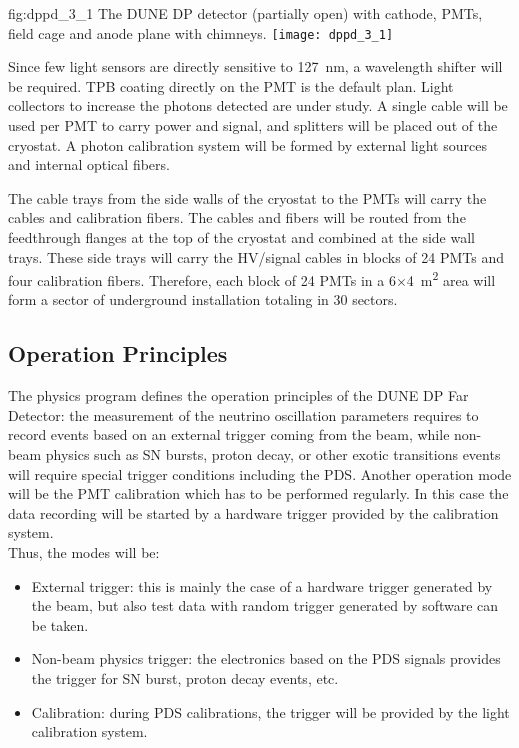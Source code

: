 \begin{dunefigure}{fig:dppd_3_1}
{The DUNE DP detector (partially open) with cathode, PMTs, field cage and anode plane with chimneys.}
\texttt{[image: dppd\_3\_1]}
\end{dunefigure}

Since few light sensors are directly sensitive to \SI{127}{nm}, a wavelength shifter will be required. TPB coating directly on the PMT is the default plan. Light collectors to increase the photons detected are under study. A single cable will be used per PMT to carry power and signal, and splitters will be placed out of the cryostat. A photon calibration system will be formed by external light sources and internal optical fibers.  

The cable trays from the side walls of the cryostat to the PMTs will carry the cables and calibration fibers. The cables and fibers will be routed from the feedthrough flanges at the top of the cryostat and  combined at the side wall trays. These side trays will carry the HV/signal cables in blocks of \num{24} PMTs and four calibration fibers. Therefore, each block of \num{24} PMTs in a \num{6}$\times$\SI{4}{m^2} area will form a sector of underground installation totaling in \num{30} sectors.

\subsection{Operation Principles}
\label{sec:fddp-pd-1.5}

The physics program defines the operation principles of the DUNE DP Far Detector: the measurement of the neutrino oscillation parameters requires to record events based on an external trigger coming from the beam, while non-beam physics such as SN bursts, proton decay, or other exotic transitions events will require special trigger conditions including the PDS. Another operation mode will be the PMT calibration which has to be performed regularly. In this case the data recording will be started by a hardware trigger provided by the calibration system. \\    

Thus, the modes will be:
\begin{itemize}
\item External trigger: this is mainly the case of a hardware trigger generated by the beam, but also test data with random trigger generated by software can be taken. 
\item Non-beam physics trigger: the electronics based on the PDS signals provides the trigger for SN burst, proton decay events, etc.
\item Calibration: during PDS calibrations, the trigger will be provided by the light calibration system.
\end{itemize}

